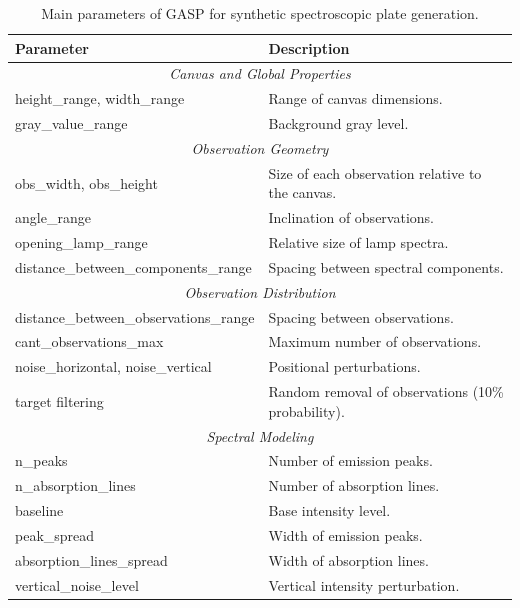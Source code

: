 \begin{table}
    \caption{Main parameters of GASP for synthetic spectroscopic plate generation.}
    \label{tab:gasp-parameters}
    \begin{tabularx}{\linewidth}{|l|X|}
        \hline
        \textbf{Parameter} & \textbf{Description} \\
        \hline

        \multicolumn{2}{|c|}{\textit{Canvas and Global Properties}} \\
        \hline
        height\_range, width\_range & Range of canvas dimensions. \\
        gray\_value\_range & Background gray level. \\

        \hline
        \multicolumn{2}{|c|}{\textit{Observation Geometry}} \\
        \hline
        obs\_width, obs\_height & Size of each observation relative to the canvas. \\
        angle\_range & Inclination of observations. \\
        opening\_lamp\_range & Relative size of lamp spectra. \\
        distance\_between\_components\_range & Spacing between spectral components. \\

        \hline
        \multicolumn{2}{|c|}{\textit{Observation Distribution}} \\
        \hline
        distance\_between\_observations\_range & Spacing between observations. \\
        cant\_observations\_max & Maximum number of observations. \\
        noise\_horizontal, noise\_vertical & Positional perturbations. \\
        target filtering & Random removal of observations (10\% probability). \\

        \hline
        \multicolumn{2}{|c|}{\textit{Spectral Modeling}} \\
        \hline
        n\_peaks & Number of emission peaks. \\
        n\_absorption\_lines & Number of absorption lines. \\
        baseline & Base intensity level. \\
        peak\_spread & Width of emission peaks. \\
        absorption\_lines\_spread & Width of absorption lines. \\
        vertical\_noise\_level & Vertical intensity perturbation. \\


\end{tabularx}
\end{table}

